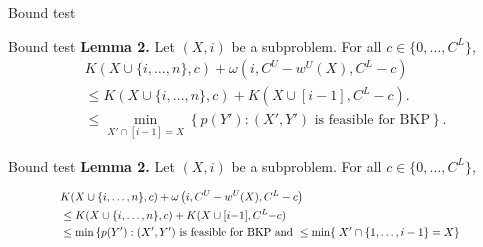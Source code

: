 \documentclass[fleqn,11pt,aspectratio=43]{beamer}
\begin{document}
\begin{frame}{Bound test}
\end{frame}




\begin{frame}{Bound test}
\textbf{Lemma 2.} Let $(X, i)$ be a subproblem. For all $c \in \{0, \ldots, C^L\}$,
\begin{align*}
    &K(X \cup \{i, \ldots, n\}, c) + \omega \left( i, C^U - w^U(X), C^L - c \right) \\
    &\leq K(X \cup \{i, \ldots, n\}, c) + 
    K(X \cup [i-1], C^L-c).
    \\
    &\leq \min_{X' \cap [i - 1] = X} \left\{ p(Y') : (X', Y') \text{ is feasible for BKP}  \right\}.
\end{align*}
\end{frame}



\begin{frame}{Bound test}
\textbf{Lemma 2.} Let $(X, i)$ be a subproblem. For all $c \in \{0, \ldots, C^L\}$,

\[
\scalebox{0.8}{$
\begin{aligned}
&K(X \cup \{i, \ldots, n\}, c) + \omega \left( i, C^U - w^U(X), C^L - c \right) \\
&\leq K(X \cup \{i, \ldots, n\}, c) + K(X \cup [i{-}1], C^L{-}c) \\
&\leq \min \left\{ p(Y') : (X', Y') \text{ is feasible for BKP and } \right. {\leq \min \{} \left. X' \cap \{1, \ldots, i - 1\} = X \right\}
\end{aligned}
$}
\]
\end{frame}
\end{document}
